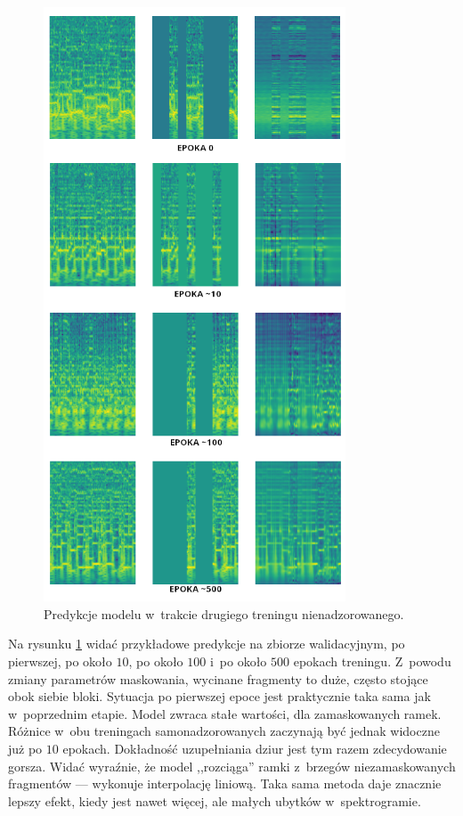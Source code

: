 \begin{figure}
    \centering
    \includegraphics[width=0.8\textwidth]{./images/mae2_predictions.png}
    \caption{Predykcje modelu w~trakcie drugiego treningu nienadzorowanego.}
    \label{fig:mae2_predictions}
\end{figure}

Na rysunku \ref{fig:mae2_predictions} widać przykładowe predykcje na zbiorze walidacyjnym, po pierwszej, po około $10$, po około $100$ i~po około $500$ epokach treningu. Z~powodu zmiany parametrów maskowania, wycinane fragmenty to duże, często stojące obok siebie bloki. Sytuacja po pierwszej epoce jest praktycznie taka sama jak w~poprzednim etapie. Model zwraca stałe wartości, dla zamaskowanych ramek. Różnice w~obu treningach samonadzorowanych zaczynają być jednak widoczne już po $10$ epokach. Dokładność uzupełniania dziur jest tym razem zdecydowanie gorsza. Widać wyraźnie, że model ,,rozciąga'' ramki z~brzegów niezamaskowanych fragmentów --- wykonuje interpolację liniową. Taka sama metoda daje znacznie lepszy efekt, kiedy jest nawet więcej, ale małych ubytków w~spektrogramie.

